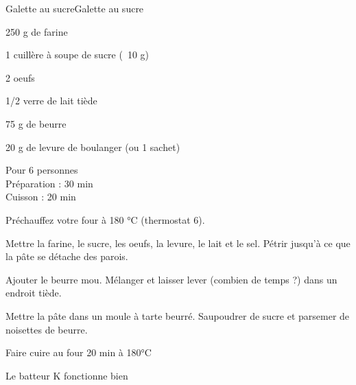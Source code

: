 \begin{recette}{Galette au sucre}{Galette au sucre}

\begin{ingredients}
250 g de farine\par
1 cuillère à soupe de sucre (~10 g)\par
2 oeufs\par
1/2 verre de lait tiède\par
75 g de beurre\par
20 g de levure de boulanger  (ou 1 sachet)\par
\end{ingredients}

\begin{infos}
Pour 6 personnes\\
Préparation : 30 min\\
Cuisson : 20 min\\
\end{infos}

\begin{etapes}
\item Préchauffez votre four à 180 °C (thermostat 6).
\item Mettre la farine, le sucre, les oeufs, la levure, le lait et le sel. Pétrir jusqu'à ce que la pâte se détache des parois.
\item Ajouter le beurre mou. Mélanger et laisser lever (combien de temps ?) dans un endroit tiède.
\item Mettre la pâte dans un moule à tarte beurré. Saupoudrer de sucre et parsemer de noisettes de beurre.
\item Faire cuire au four 20 min à 180°C
\end{etapes}

\begin{conseils}
Le batteur K fonctionne bien
\end{conseils}

\end{recette}